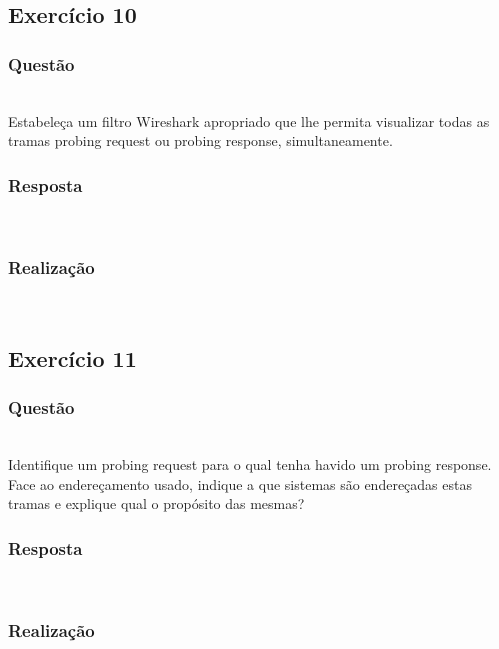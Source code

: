 \documentclass{llncs}
\begin{document}
\clearpage
\subsection{Exercício 10}
\subsubsection{Questão}\rule[-10pt]{0pt}{10pt}\\

Estabeleça um filtro Wireshark apropriado que lhe permita visualizar todas as tramas probing request ou probing response, simultaneamente.

\subsubsection{Resposta}\rule[-10pt]{0pt}{10pt}\\



\subsubsection{Realização}\rule[-10pt]{0pt}{10pt}\\




\clearpage
\subsection{Exercício 11}
\subsubsection{Questão}\rule[-10pt]{0pt}{10pt}\\

Identifique um probing request para o qual tenha havido um probing response. Face ao endereçamento usado, indique a que sistemas são endereçadas estas tramas e explique qual o propósito das mesmas?

\subsubsection{Resposta}\rule[-10pt]{0pt}{10pt}\\



\subsubsection{Realização}\rule[-10pt]{0pt}{10pt}\\
\end{document}

